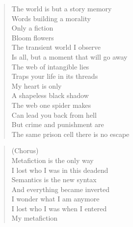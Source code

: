 \phantom{;}
\clearpage



\begin{minipage}{0.5\textwidth}
    \begin{verse}
    The world is but a story memory \\
	Words building a morality \\
	Only a fiction \\
	Bloom flowers \\
	The transient world I observe \\
	Is all, but a moment that will go away \\
	The web of intangible lies \\
	Traps your life in its threads \\
	My heart is only \\
	A shapeless black shadow \\
	The web one spider makes \\
	Can lead you back from hell \\
	But crime and punishment are \\
	The same prison cell there is no escape
    \end{verse}

    \begin{verse}
    (Chorus) \\
	Metafiction is the only way \\
	I lost who I was in this deadend \\
	Semantics is the new syntax \\
	And everything became inverted \\
	I wonder what I am anymore \\
	I lost who I was when I entered \\
	My metafiction
    \end{verse}

\end{minipage}
